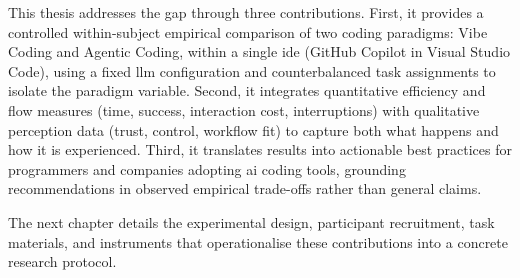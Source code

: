 This thesis addresses the gap through three contributions. First, it provides a controlled within-subject empirical comparison of two coding paradigms: Vibe Coding and Agentic Coding, within a single \gls{ide} (GitHub Copilot in Visual Studio Code), using a fixed \gls{llm} configuration and counterbalanced task assignments to isolate the paradigm variable. Second, it integrates quantitative efficiency and flow measures (time, success, interaction cost, interruptions) with qualitative perception data (trust, control, workflow fit) to capture both what happens and how it is experienced. Third, it translates results into actionable best practices for programmers and companies adopting \gls{ai} coding tools, grounding recommendations in observed empirical trade-offs rather than general claims.

The next chapter details the experimental design, participant recruitment, task materials, and instruments that operationalise these contributions into a concrete research protocol.

